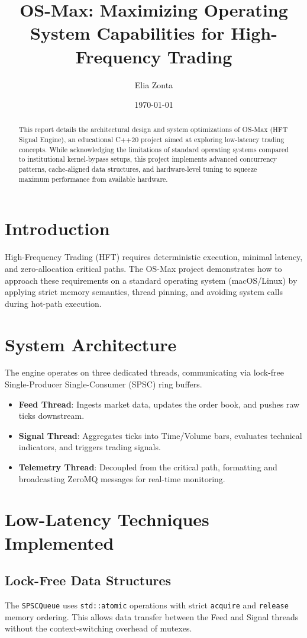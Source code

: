\documentclass{article}
\title{OS-Max: Maximizing Operating System Capabilities for High-Frequency Trading}
\author{Elia Zonta}
\date{\today}
\begin{document}
\maketitle

\begin{abstract}
This report details the architectural design and system optimizations of OS-Max (HFT Signal Engine), an educational C++20 project aimed at exploring low-latency trading concepts. While acknowledging the limitations of standard operating systems compared to institutional kernel-bypass setups, this project implements advanced concurrency patterns, cache-aligned data structures, and hardware-level tuning to squeeze maximum performance from available hardware.
\end{abstract}

\section{Introduction}
High-Frequency Trading (HFT) requires deterministic execution, minimal latency, and zero-allocation critical paths. The OS-Max project demonstrates how to approach these requirements on a standard operating system (macOS/Linux) by applying strict memory semantics, thread pinning, and avoiding system calls during hot-path execution. 

\section{System Architecture}
The engine operates on three dedicated threads, communicating via lock-free Single-Producer Single-Consumer (SPSC) ring buffers.
\begin{itemize}
    \item \textbf{Feed Thread}: Ingests market data, updates the order book, and pushes raw ticks downstream.
    \item \textbf{Signal Thread}: Aggregates ticks into Time/Volume bars, evaluates technical indicators, and triggers trading signals.
    \item \textbf{Telemetry Thread}: Decoupled from the critical path, formatting and broadcasting ZeroMQ messages for real-time monitoring.
\end{itemize}

\section{Low-Latency Techniques Implemented}
\subsection{Lock-Free Data Structures}
The \texttt{SPSCQueue} uses \texttt{std::atomic} operations with strict \texttt{acquire} and \texttt{release} memory ordering. This allows data transfer between the Feed and Signal threads without the context-switching overhead of mutexes.
\end{document}
